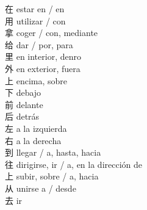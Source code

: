 在 \quad estar en / en\\
用 \quad utilizar / con\\
拿 \quad coger / con, mediante\\
给 \quad dar / por, para\\
里 \quad en interior, denro\\
外 \quad en exterior, fuera\\
上 \quad encima, sobre\\
下 \quad debajo\\
前 \quad delante\\
后 \quad detrás\\
左 \quad a la izquierda\\
右 \quad a la derecha\\
到 \quad llegar / a, hasta, hacia\\
往 \quad dirigirse, ir / a, en la dirección de\\
上 \quad subir, sobre / a, hacia\\
从 \quad unirse a / desde\\
去 \quad ir\\
